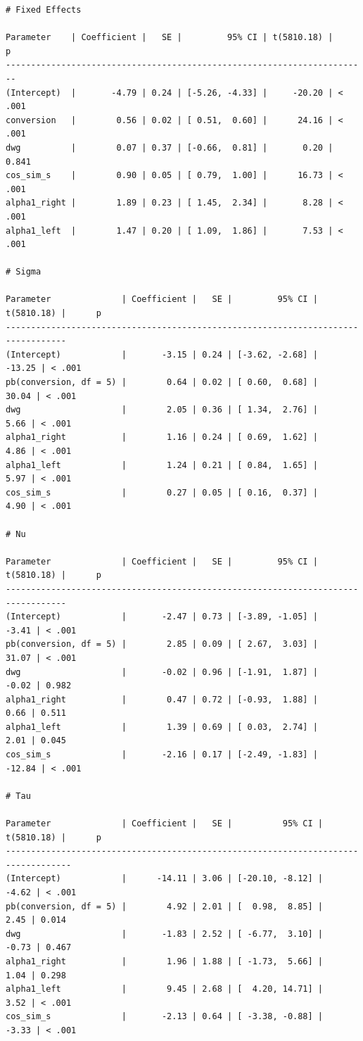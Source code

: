 \documentclass[
]{article}
\begin{document}
\begin{verbatim}
# Fixed Effects

Parameter    | Coefficient |   SE |         95% CI | t(5810.18) |      p
------------------------------------------------------------------------
(Intercept)  |       -4.79 | 0.24 | [-5.26, -4.33] |     -20.20 | < .001
conversion   |        0.56 | 0.02 | [ 0.51,  0.60] |      24.16 | < .001
dwg          |        0.07 | 0.37 | [-0.66,  0.81] |       0.20 | 0.841 
cos_sim_s    |        0.90 | 0.05 | [ 0.79,  1.00] |      16.73 | < .001
alpha1_right |        1.89 | 0.23 | [ 1.45,  2.34] |       8.28 | < .001
alpha1_left  |        1.47 | 0.20 | [ 1.09,  1.86] |       7.53 | < .001

# Sigma

Parameter              | Coefficient |   SE |         95% CI | t(5810.18) |      p
----------------------------------------------------------------------------------
(Intercept)            |       -3.15 | 0.24 | [-3.62, -2.68] |     -13.25 | < .001
pb(conversion, df = 5) |        0.64 | 0.02 | [ 0.60,  0.68] |      30.04 | < .001
dwg                    |        2.05 | 0.36 | [ 1.34,  2.76] |       5.66 | < .001
alpha1_right           |        1.16 | 0.24 | [ 0.69,  1.62] |       4.86 | < .001
alpha1_left            |        1.24 | 0.21 | [ 0.84,  1.65] |       5.97 | < .001
cos_sim_s              |        0.27 | 0.05 | [ 0.16,  0.37] |       4.90 | < .001

# Nu

Parameter              | Coefficient |   SE |         95% CI | t(5810.18) |      p
----------------------------------------------------------------------------------
(Intercept)            |       -2.47 | 0.73 | [-3.89, -1.05] |      -3.41 | < .001
pb(conversion, df = 5) |        2.85 | 0.09 | [ 2.67,  3.03] |      31.07 | < .001
dwg                    |       -0.02 | 0.96 | [-1.91,  1.87] |      -0.02 | 0.982 
alpha1_right           |        0.47 | 0.72 | [-0.93,  1.88] |       0.66 | 0.511 
alpha1_left            |        1.39 | 0.69 | [ 0.03,  2.74] |       2.01 | 0.045 
cos_sim_s              |       -2.16 | 0.17 | [-2.49, -1.83] |     -12.84 | < .001

# Tau

Parameter              | Coefficient |   SE |          95% CI | t(5810.18) |      p
-----------------------------------------------------------------------------------
(Intercept)            |      -14.11 | 3.06 | [-20.10, -8.12] |      -4.62 | < .001
pb(conversion, df = 5) |        4.92 | 2.01 | [  0.98,  8.85] |       2.45 | 0.014 
dwg                    |       -1.83 | 2.52 | [ -6.77,  3.10] |      -0.73 | 0.467 
alpha1_right           |        1.96 | 1.88 | [ -1.73,  5.66] |       1.04 | 0.298 
alpha1_left            |        9.45 | 2.68 | [  4.20, 14.71] |       3.52 | < .001
cos_sim_s              |       -2.13 | 0.64 | [ -3.38, -0.88] |      -3.33 | < .001
\end{verbatim}
\end{document}
